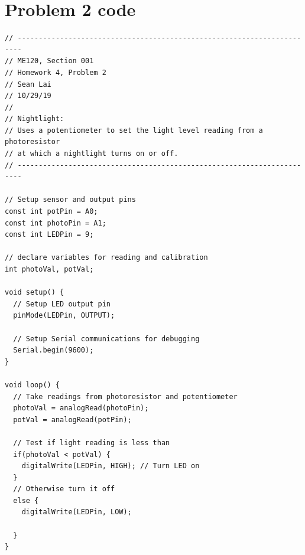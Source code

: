 \documentclass{article}
\begin{document}
\section*{Problem 2 code}
\begin{verbatim}
// -----------------------------------------------------------------------
// ME120, Section 001
// Homework 4, Problem 2
// Sean Lai
// 10/29/19
//
// Nightlight:
// Uses a potentiometer to set the light level reading from a photoresistor
// at which a nightlight turns on or off.
// -----------------------------------------------------------------------

// Setup sensor and output pins
const int potPin = A0;
const int photoPin = A1;
const int LEDPin = 9;

// declare variables for reading and calibration
int photoVal, potVal;

void setup() {
  // Setup LED output pin
  pinMode(LEDPin, OUTPUT);

  // Setup Serial communications for debugging
  Serial.begin(9600);
}

void loop() {
  // Take readings from photoresistor and potentiometer
  photoVal = analogRead(photoPin);
  potVal = analogRead(potPin);

  // Test if light reading is less than
  if(photoVal < potVal) {
    digitalWrite(LEDPin, HIGH); // Turn LED on
  }
  // Otherwise turn it off
  else {
    digitalWrite(LEDPin, LOW);

  }
}
\end{verbatim}

\newpage
\end{document}
